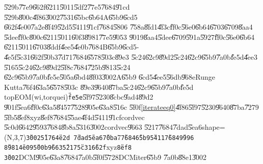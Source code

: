 \U{529b}\U{77e9}\U{662f}\U{6211}\U{5011}\U{5df2}\U{77e5}\U{7684}\U{91cd}%
\U{529b}\U{800c}\U{4f86}\U{3002}\U{7531}\U{65bc}\U{6b64}A\U{65b9}\U{6cd5}%
\U{662f}\U{4e00}\U{7a2e}\U{8f49}\U{52d5}\U{5411}\U{91cf}\U{7684}\U{5806}%
\U{758a}\U{8fd1}\U{4f3c}\U{ff0c}\U{56e0}\U{6b64}\U{6703}\U{6709}\U{8aa4}%
\U{5dee}\U{ff0c}\U{800c}\U{6211}\U{5011}\U{60f3}\U{8981}\U{77e5}\U{9053}%
\U{9019}\U{8aa4}\U{5dee}\U{6709}\U{591a}\U{5927}\U{ff0c}\U{56e0}\U{6b64}%
\U{6211}\U{5011}\U{6703}\U{8ddf}\U{4ee5}\U{4e0b}\U{7684}B\U{65b9}\U{6cd5}-%
\U{4e5f}\U{5c31}\U{662f}\U{50b3}\U{7d71}\U{7684}\U{6578}\U{503c}\U{89e3}%
\U{5c24}\U{62c9}\U{89d2}\U{5c24}\U{62c9}\U{65b9}\U{7a0b}\U{fe5d}\U{4ee3}%
\U{5165}\U{5c24}\U{62c9}\U{89d2}\U{5f8c}\U{7684}\U{725b}\U{9813}\U{5c24}%
\U{62c9}\U{65b9}\U{7a0b}\U{fe5e}\U{505a}\U{6bd4}\U{8f03}\U{3002}A\U{65b9}%
\U{6cd5}\U{4ee5}\U{56db}\U{968e}Runge Kutta\U{76f4}\U{63a5}\U{6578}\U{503c}%
\U{89e3}\U{9640}\U{87ba}\U{5c24}\U{62c9}\U{65b9}\U{7a0b}\U{fe5d}%
topEOM(wi,torquei)\texttt{\U{fe5e}}\U{5f97}\U{5230}\U{8cbc}\U{9ad4}\U{89d2}%
\U{901f}\U{5ea6}\U{ff0c}\U{63a5}\U{8457}\U{7528}\U{905e}\U{63a8}\U{516c}%
\U{5f0f}\ref{iterateeq0}\U{4f86}\U{5f97}\U{5230}\U{9640}\U{87ba}\U{7279}%
\U{5fb5}\U{8ef8}xyz\U{8ef8}\U{7684}\U{55ae}\U{4f4d}\U{5411}\U{91cf}cordvec%
\U{5c0d}\U{6642}\U{9593}\U{7684}\U{8b8a}\U{5316}\U{3002}cordvec\U{9663}%
\U{5217}\U{7684}\U{7dad}\U{5ea6}shape=(N,3,7)\texttt{\U{3002}\U{5176}\U{4e2d}%
\U{7dad}\U{5ea6}\U{70ba}}7\texttt{\U{7684}\U{65b9}\U{5411}\U{7684}\U{9996}%
\U{8981}\U{4e09}\U{500b}\U{9663}\U{5217}\U{5c31}\U{662f}}xyz\texttt{\U{8ef8}%
\U{3002}}DCM\U{905e}\U{63a8}\U{7684}\U{7a0b}\U{5f0f}\U{5728}DCMiter\U{65b9}%
\U{7a0b}\U{88e1}\U{3002}

\bigskip

